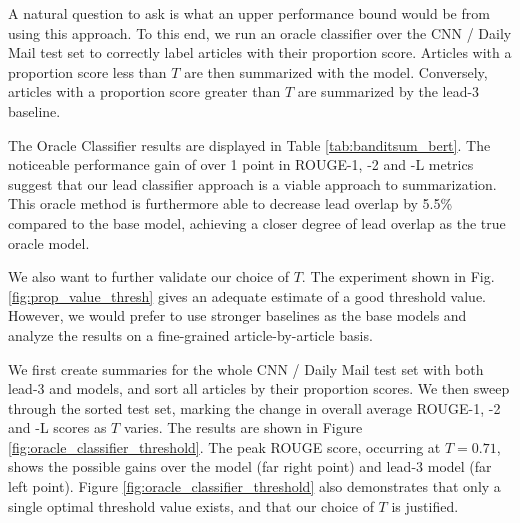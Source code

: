A natural question to ask is what an upper performance bound would be from using this approach. To this end, we run an oracle classifier over the CNN / Daily Mail test set to correctly label articles with their proportion score. Articles with a proportion score less than $T$ are then summarized with the \BanSumLate{} model. Conversely, articles with a proportion score greater than $T$ are summarized by the lead-3 baseline.

The Oracle Classifier results are displayed in Table \ref{tab:banditsum_bert}. The noticeable performance gain of over 1 point in ROUGE-1, -2 and -L metrics suggest that our lead classifier approach is a viable approach to summarization. This oracle method is furthermore able to decrease lead overlap by 5.5\% compared to the base \BanSumLate{} model, achieving a closer degree of lead overlap as the true oracle model.

We also want to further validate our choice of $T$. The experiment shown in Fig. \ref{fig:prop_value_thresh} gives an adequate estimate of a good threshold value. However, we would prefer to use stronger baselines as the base models and analyze the results on a fine-grained article-by-article basis.

We first create summaries for the whole CNN / Daily Mail test set with both lead-3 and \BanSumLate{} models, and sort all articles by their proportion scores. We then sweep through the sorted test set, marking the change in overall average ROUGE-1, -2 and -L scores as $T$ varies. The results are shown in Figure \ref{fig:oracle_classifier_threshold}. The peak ROUGE score, occurring at $T=0.71$, shows the possible gains over the \BanSumLate{} model (far right point) and lead-3 model (far left point). Figure \ref{fig:oracle_classifier_threshold} also demonstrates that only a single optimal threshold value exists, and that our choice of $T$ is justified.

